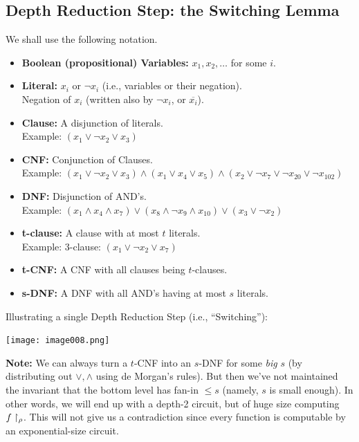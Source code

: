 \subsection{Depth Reduction Step: the Switching Lemma}

We shall use the following notation.
\begin{itemize}
    \item \textbf{Boolean (propositional) Variables:} \(x_1, x_2, \ldots \) for some \(i\).
    \item \textbf{Literal:} \(x_i\) or \(\neg x_i\) (i.e., variables or their negation).\\
    Negation of \(x_i\) (written also by \(\neg x_i\), or $\overline {x_i}$).
    \item \textbf{Clause:} A disjunction of literals.\\
    Example: \((x_1 \lor \neg x_2 \lor x_3)\)
    \item \textbf{CNF:} Conjunction of Clauses.\\
    Example: \((x_1 \lor \neg x_2 \lor x_3) \land (x_1 \lor x_4 \lor x_5) \land (x_2 \lor \neg x_7 \lor \neg x_{20} \lor \neg x_{102})\)
    \item \textbf{DNF:} Disjunction of AND's.\\
    Example: \((x_1 \land x_4 \land x_7) \lor (x_8 \land \neg x_9 \land x_{10}) \lor (x_3 \lor \neg x_2)\)
    \item \textbf{t-clause:} A clause with at most \(t\) literals.\\
    Example: 3-clause: \((x_1 \lor \neg x_2 \lor x_7)\)
    \item \textbf{t-CNF:} A CNF with all clauses being \(t\)-clauses.
    \item \textbf{s-DNF:} A DNF with all AND's having at most \(s\) literals.
\end{itemize}


Illustrating a single Depth Reduction Step (i.e., ``Switching''):

\texttt{[image: image008.png]}

\noindent\textbf{Note:} We can always turn a $t$-CNF into an $s$-DNF for some \textit{big} $s$ (by distributing out \(\lor, \land\) using de Morgan's rules).
But then we've not maintained the invariant that the bottom level has fan-in \(\leq s\) (namely, \(s\) is small enough).
In other words, we will end up with a depth-2 circuit, but of huge size computing \(f\upharpoonright_\rho\). This will not give us a contradiction since every function is computable by an exponential-size circuit.


